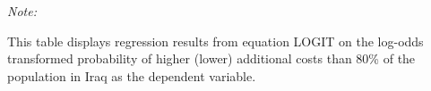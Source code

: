 \begin{table}[htbp!]
\begin{adjustbox}{width = 1\textwidth, max height = 0.95\textheight, center}
\begin{threeparttable}[b]
         \begin{tablenotes}\item \medskip \textit{Note:}
            \item This table displays regression results from equation LOGIT on the log-odds transformed probability of higher (lower) additional costs than 80\% of the population in Iraq as the dependent variable. 
         \end{tablenotes}
      \end{threeparttable}
   \end{adjustbox}
\end{table}


